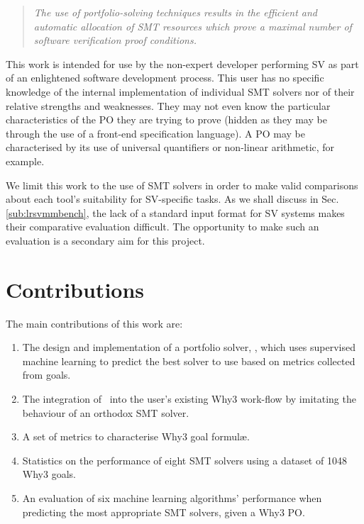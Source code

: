 \begin{quote}
	\textit{The use of portfolio-solving techniques results in the efficient and \nobreakdash automatic allocation of SMT resources which prove a maximal number of \nobreakdash software verification proof conditions.}
\end{quote}

This work is intended for use by the non-expert developer performing SV as part of an enlightened software development process.
This user has no specific knowledge of the internal implementation of individual SMT solvers nor of their relative strengths and weaknesses. 
They may not even know the particular characteristics of the PO they are trying to prove (hidden as they may be through the use of a front-end specification language).
A PO may be characterised by its use of universal quantifiers or non-linear arithmetic, for example.

We limit this work to the use of SMT solvers in order to make valid comparisons about each tool's suitability for SV-specific tasks.
As we shall discuss in Sec. \ref{sub:lrsvmmbench}, the lack of a standard input format for SV systems makes their comparative evaluation difficult.
The opportunity to make such an evaluation is a secondary aim for this project.

\section{Contributions}
The main contributions of this work are:
\begin{enumerate}
	\item The design  and implementation of a portfolio solver, \where, which uses supervised machine learning to predict the best solver to use based on metrics collected from goals.
	\item The integration of \where~into the user's existing \textsf{Why3} work-flow by imitating the behaviour of an orthodox SMT solver.
	\item A set of metrics to characterise \textsf{Why3} goal formul\ae.
	\item Statistics on the performance of eight SMT solvers using a dataset of 1048 \textsf{Why3} goals.
	\item An evaluation of six machine learning algorithms' performance when predicting the most appropriate SMT solvers, given a \textsf{Why3} PO.  
	
\end{enumerate}

